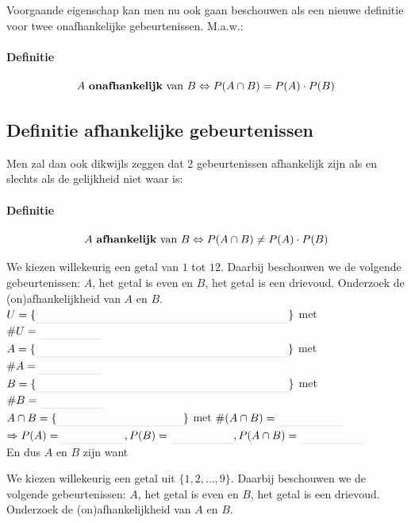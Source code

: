 \documentclass[12pt,twoside]{article}
\begin{document}
Voorgaande eigenschap kan men nu ook gaan beschouwen als een nieuwe definitie voor twee onafhankelijke gebeurtenissen. M.a.w.:

\paragraph*{Definitie}
\begin{mdframed}
$$A \mbox{ {\bf onafhankelijk} van } B \Leftrightarrow P(A\cap B)=P(A)\cdot P(B)$$
\end{mdframed}

\subsection{Definitie afhankelijke gebeurtenissen}

 Men zal dan ook dikwijls zeggen dat 2 gebeurtenissen afhankelijk zijn als en slechts als de gelijkheid niet waar is:

\paragraph*{Definitie}
\begin{mdframed}
$$A \mbox{ {\bf afhankelijk} van } B \Leftrightarrow P(A\cap B)\neq P(A)\cdot P(B)$$
\end{mdframed}

\begin{oefening} We kiezen willekeurig een getal van $1$ tot $12$. Daarbij beschouwen we de volgende gebeurtenissen: $A$, het getal is even en $B$, het getal is een drievoud. Onderzoek de (on)afhankelijkheid van $A$ en $B$.\\
$U=\{\arule{8cm}\}$ met $\#U=\arule{2cm}$\\
$A=\{\arule{8cm}\}$ met $\#A=\arule{2cm}$\\
$B=\{\arule{8cm}\}$ met $\#B=\arule{2cm}$\\

$A\cap B=\{\arule{4cm}\}$ met $\#(A\cap B)=\arule{2cm}$\\

$\Rightarrow P(A)=\arule{2cm}, P(B)=\arule{2cm}, P(A\cap B)=\arule{2cm}$\\

En dus $A$ en $B$ zijn \arule{4cm} want \arule{4cm}
\end{oefening}

\begin{oefening}
We kiezen willekeurig een getal uit $\{1,2,\ldots, 9\}$. Daarbij beschouwen we de volgende gebeurtenissen: $A$, het getal is even en $B$, het getal is een drievoud. Onderzoek de (on)afhankelijkheid van $A$ en $B$.
\end{oefening}
\end{document}
